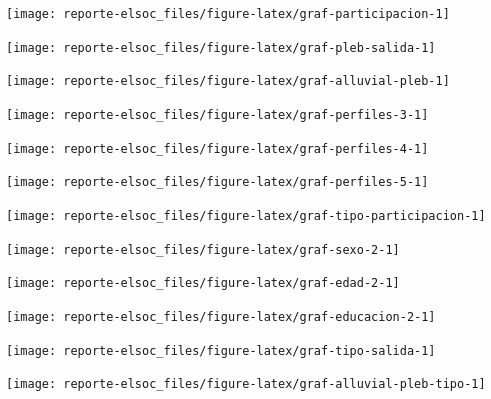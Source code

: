 \documentclass[
  12pt,
]{book}
\begin{document}
\begin{center}\texttt{[image: reporte-elsoc\_files/figure-latex/graf-participacion-1]} \end{center}

\begin{center}\texttt{[image: reporte-elsoc\_files/figure-latex/graf-pleb-salida-1]} \end{center}

\begin{center}\texttt{[image: reporte-elsoc\_files/figure-latex/graf-alluvial-pleb-1]} \end{center}

\begin{center}\texttt{[image: reporte-elsoc\_files/figure-latex/graf-perfiles-3-1]} \end{center}

\begin{center}\texttt{[image: reporte-elsoc\_files/figure-latex/graf-perfiles-4-1]} \end{center}

\begin{center}\texttt{[image: reporte-elsoc\_files/figure-latex/graf-perfiles-5-1]} \end{center}

\begin{center}\texttt{[image: reporte-elsoc\_files/figure-latex/graf-tipo-participacion-1]} \end{center}

\begin{center}\texttt{[image: reporte-elsoc\_files/figure-latex/graf-sexo-2-1]} \end{center}

\begin{center}\texttt{[image: reporte-elsoc\_files/figure-latex/graf-edad-2-1]} \end{center}

\begin{center}\texttt{[image: reporte-elsoc\_files/figure-latex/graf-educacion-2-1]} \end{center}

\begin{center}\texttt{[image: reporte-elsoc\_files/figure-latex/graf-tipo-salida-1]} \end{center}

\begin{center}\texttt{[image: reporte-elsoc\_files/figure-latex/graf-alluvial-pleb-tipo-1]} \end{center}
\end{document}
